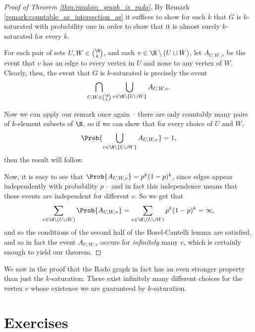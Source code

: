 \documentclass[nobib]{tufte-handout}
\begin{document}
\begin{proof}[Proof of Theorem \ref{thm:random_graph_is_rado}]
    By Remark \ref{remark:countable_as_intersection_as} it suffices to show for each $k$ that $G$ is $k$-saturated with probability one in order to show that it is almost surely $k$-saturated for every $k$.

    For each pair of sets $U, W \in \binom{\N}{k}$, and each $v \in \N \setminus (U \cup W)$, let $A_{U,W,v}$ be the event that $v$ has an edge to every vertex in $U$ and none to any vertex of $W$. Clearly, then, the event that $G$ is $k$-saturated is precisely the event
    $$\bigcap_{U, W \in \binom{\N}{k}} \bigcup_{v \in \N \setminus \{U \cup W\}} A_{U,W,v}.$$

    Now we can apply our remark once again -- there are only countably many pairs of $k$-element subsets of $\N$, so if we can show that for every choice of $U$ and $W$,
    $$\Prob{\bigcup_{v \in \N \setminus \{U \cup W\}} A_{U,W,v}} = 1,$$
    then the result will follow.

    Now, it is easy to see that $\Prob{A_{U,W,v}} = p^k(1-p)^k$, since edges appear independently with probability $p$ -- and in fact this independence means that these events are independent for different $v$. So we get that
    $$\sum_{v \in \N \setminus (U \cup W)} \Prob{A_{U,W,v}} = \sum_{v \in \N \setminus (U \cup W)} p^k(1-p)^k = \infty,$$
    and so the conditions of the second half of the Borel-Cantelli lemma are satisfied, and so in fact the event $A_{U,W,v}$ occurs for \emph{infinitely} many $v$, which is certainly enough to yield our theorem.
\end{proof}

\begin{remark}
    We saw in the proof that the Rado graph in fact has an even stronger property than just the $k$-saturation: There exist infinitely many different choices for the vertex $v$ whose existence we are guaranteed by $k$-saturation.
\end{remark}

\section{Exercises}


%
%
\end{document}
